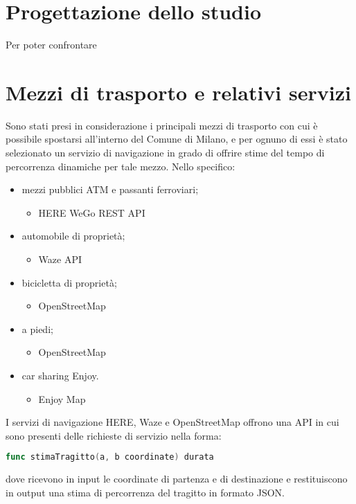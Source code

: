 \section{Progettazione dello studio}

Per poter confrontare 

\section{Mezzi di trasporto e relativi servizi}

Sono stati presi in considerazione i principali mezzi di trasporto con cui è possibile spostarsi all'interno del Comune di Milano, e per ognuno di essi è stato selezionato un servizio di navigazione in grado di offrire stime del tempo di percorrenza dinamiche per tale mezzo. Nello specifico:

\begin{itemize}
	\item mezzi pubblici ATM e passanti ferroviari;
	\begin{itemize}
		\item HERE WeGo REST API\cite{herewegoapi}
	\end{itemize}
	\item automobile di proprietà;
	\begin{itemize}
		\item Waze API\cite{wazeapi}
	\end{itemize}
	\item bicicletta di proprietà;
	\begin{itemize}
		\item OpenStreetMap\cite{openstreetmap}
	\end{itemize}
	\item a piedi;
	\begin{itemize}
		\item OpenStreetMap\cite{openstreetmap}
	\end{itemize}
	\item car sharing Enjoy.
	\begin{itemize}
		\item Enjoy Map\cite{enjoycarsharing}
	\end{itemize}
\end{itemize}

I servizi di navigazione HERE, Waze e OpenStreetMap offrono una API in cui sono presenti delle richieste di servizio nella forma:
\begin{lstlisting}[language=Go]
func stimaTragitto(a, b coordinate) durata
\end{lstlisting}
dove ricevono in input le coordinate di partenza e di destinazione e restituiscono in output una stima di percorrenza del tragitto in formato JSON.

